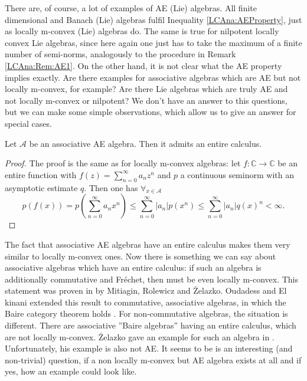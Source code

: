There are, of course, a lot of examples of AE (Lie) algebras. 
All finite dimensional and Banach (Lie) algebras fulfil Inequality
\eqref{LCAna:AEProperty}, just as locally m-convex (Lie) algebras do. 
The same is true for nilpotent locally convex Lie algebras, 
since here again one just has to take the maximum of a finite 
number of semi-norms, analogously to the procedure in Remark 
\ref{LCAna:Rem:AE1}. On the other hand, it is not clear what the AE property 
implies exactly. Are there examples for associative algebras which are AE but 
not locally m-convex, for example? Are there Lie algebras which are truly AE 
and not locally m-convex or nilpotent? We don't have an answer to this 
questions, but we can make some simple observations, which allow us to give an 
answer for special cases.
\begin{proposition}
	Let $\mathcal{A}$ be an associative AE algebra. Then it admits an
	entire calculus.
\end{proposition}
\begin{proof}
	The proof is the same as for locally m-convex algebras: let 
	$f \colon \mathbb{C} \longrightarrow \mathbb{C}$ be an entire 
	function with $f(z) = \sum_{n=0}^{\infty} a_n z^n$ and $p$
	a continuous seminorm with an asymptotic estimate $q$.
	Then one has $\forall_{x \in \mathcal{A}}$
	\begin{equation*}
		p(f(x))
		=
		p \left(
			\sum\limits_{n=0}^{\infty}
			a_n x^n
		\right)
		\leq
		\sum\limits_{n=0}^{\infty}
		|a_n| 
		p \left( x^n \right)
		\leq
		\sum\limits_{n=0}^{\infty}
		|a_n| q(x)^n
		<
		\infty.
	\end{equation*}
\end{proof}
\begin{remark}
	The fact that associative AE algebras have an entire calculus makes them 
	very similar to locally m-convex ones.
	Now there is something we can say about associative algebras which have an 
	entire calculus: if such an algebra is additionally commutative and 
	Fr\'echet, then must be even locally m-convex. This statement was proven 
	in \cite{mitiagin.rolewicz.zelazko:1962a} by Mitiagin, Rolewicz and 
	{\.Z}elazko. Oudadess and El kinani extended this result to commutative, 
	associative algebras, in which the Baire category theorem holds 
	\cite{elkinani.oudadess:1997a}. For non-commutative algebras, the 
	situation is different. There are associative ''Baire algebras'' having an 
	entire calculus, which are not locally m-convex. {\.Z}elazko gave an 
	example for such an algebra in \cite{zelazko:1994a}. Unfortunately, his 
	example is also not AE. It seems to be is an interesting (and non-trivial) 
	question, if a non locally m-convex but AE algebra exists at all and if 
	yes, how an example could look like.
\end{remark}



